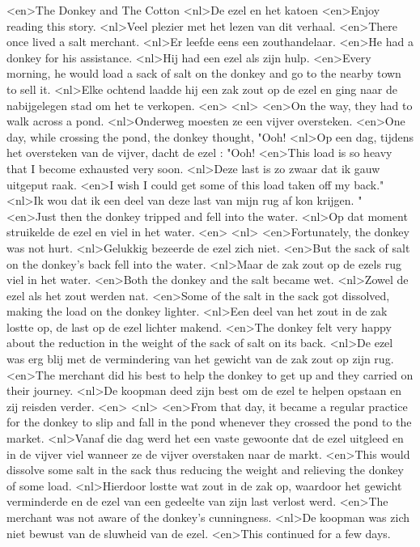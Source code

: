 <en>The Donkey and The Cotton
<nl>De ezel en het katoen
<en>Enjoy reading this story.
<nl>Veel plezier met het lezen van dit verhaal.
<en>There once lived a salt merchant.
<nl>Er leefde eens een zouthandelaar.
<en>He had a donkey for his assistance.
<nl>Hij had een ezel als zijn  hulp.
<en>Every morning, he would load a sack of salt on the donkey and go to the nearby town to sell it.
<nl>Elke ochtend laadde hij een zak zout op de ezel en ging naar de nabijgelegen stad om het te verkopen.
<en>
<nl>
<en>On the way, they had to walk across a pond.
<nl>Onderweg moesten ze een vijver oversteken.
<en>One day, while crossing the pond, the donkey thought, "Ooh!
<nl>Op een dag, tijdens het oversteken van de vijver, dacht de ezel : "Ooh!
<en>This load is so heavy that I become exhausted very soon.
<nl>Deze last is zo zwaar dat ik gauw uitgeput raak.
<en>I wish I could get some of this load taken off my back."
<nl>Ik wou dat ik een deel van deze last van mijn rug af kon krijgen. "
<en>Just then the donkey tripped and fell into the water.
<nl>Op dat moment struikelde de ezel en viel in het water.
<en>
<nl>
<en>Fortunately, the donkey was not hurt.
<nl>Gelukkig bezeerde  de ezel zich niet.
<en>But the sack of salt on the donkey’s back fell into the water.
<nl>Maar de zak zout op de ezels rug viel in het water.
<en>Both the donkey and the salt became wet.
<nl>Zowel de ezel als het zout werden nat.
<en>Some of the salt in the sack got dissolved, making the load on the donkey lighter.
<nl>Een deel van het zout in de zak lostte op, de last op de ezel lichter makend.
<en>The donkey felt very happy about the reduction in the weight of the sack of salt on its back.
<nl>De ezel was erg blij met de vermindering van het gewicht van de zak zout op zijn rug.
<en>The merchant did his best to help the donkey to get up and they carried on their journey.
<nl>De koopman deed zijn best om de ezel te helpen opstaan en zij reisden verder.
<en>
<nl>
<en>From that day, it became a regular practice for the donkey to slip and fall in the pond whenever they crossed the pond to the market.
<nl>Vanaf die dag werd het een vaste gewoonte dat de ezel uitgleed en in de vijver viel wanneer ze de vijver overstaken naar de markt.
<en>This would dissolve some salt in the sack thus reducing the weight and relieving the donkey of some load.
<nl>Hierdoor lostte wat zout in de zak op, waardoor het gewicht verminderde en de ezel van een gedeelte van zijn last verlost werd.
<en>The merchant was not aware of the donkey’s cunningness.
<nl>De koopman was zich niet bewust van de sluwheid van de ezel.
<en>This continued for a few days.
